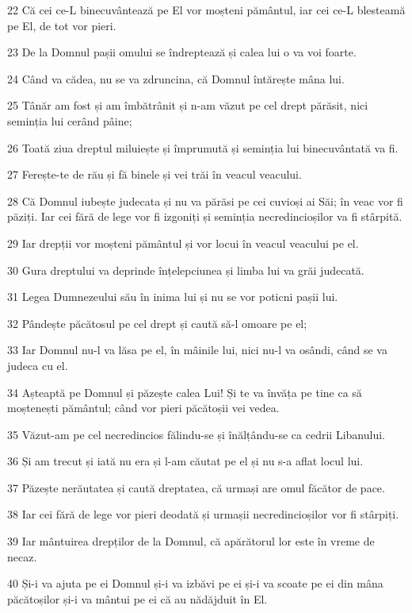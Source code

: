 \par 22 Că cei ce-L binecuvântează pe El vor moșteni pământul, iar cei ce-L blesteamă pe El, de tot vor pieri.
\par 23 De la Domnul pașii omului se îndreptează și calea lui o va voi foarte.
\par 24 Când va cădea, nu se va zdruncina, că Domnul întărește mâna lui.
\par 25 Tânăr am fost și am îmbătrânit și n-am văzut pe cel drept părăsit, nici seminția lui cerând pâine;
\par 26 Toată ziua dreptul miluiește și împrumută și seminția lui binecuvântată va fi.
\par 27 Ferește-te de rău și fă binele și vei trăi în veacul veacului.
\par 28 Că Domnul iubește judecata și nu va părăsi pe cei cuvioși ai Săi; în veac vor fi păziți. Iar cei fără de lege vor fi izgoniți și seminția necredincioșilor va fi stârpită.
\par 29 Iar drepții vor moșteni pământul și vor locui în veacul veacului pe el.
\par 30 Gura dreptului va deprinde înțelepciunea și limba lui va grăi judecată.
\par 31 Legea Dumnezeului său în inima lui și nu se vor poticni pașii lui.
\par 32 Pândește păcătosul pe cel drept și caută să-l omoare pe el;
\par 33 Iar Domnul nu-l va lăsa pe el, în mâinile lui, nici nu-l va osândi, când se va judeca cu el.
\par 34 Așteaptă pe Domnul și păzește calea Lui! Și te va învăța pe tine ca să moștenești pământul; când vor pieri păcătoșii vei vedea.
\par 35 Văzut-am pe cel necredincios fălindu-se și înălțându-se ca cedrii Libanului.
\par 36 Și am trecut și iată nu era și l-am căutat pe el și nu s-a aflat locul lui.
\par 37 Păzește nerăutatea și caută dreptatea, că urmași are omul făcător de pace.
\par 38 Iar cei fără de lege vor pieri deodată și urmașii necredincioșilor vor fi stârpiți.
\par 39 Iar mântuirea drepților de la Domnul, că apărătorul lor este în vreme de necaz.
\par 40 Și-i va ajuta pe ei Domnul și-i va izbăvi pe ei și-i va scoate pe ei din mâna păcătoșilor și-i va mântui pe ei că au nădăjduit în El.

